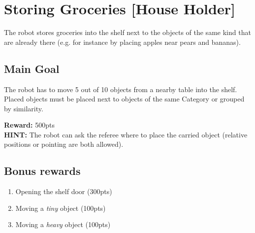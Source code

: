 \section{Storing Groceries [House Holder]}
The robot stores groceries into the shelf next to the objects of the same kind that are already there (e.g. for instance by placing apples near pears and bananas).


\subsection{Main Goal}
The robot has to move 5 out of 10 objects from a nearby table into the shelf. Placed objects must be placed next to objects of the same Category or grouped by similarity.

\noindent\textbf{Reward:} 500pts\\

\noindent\textbf{HINT:} The robot can ask the referee where to place the carried object (relative positions or pointing are both allowed).

\subsection{Bonus rewards}
\begin{enumerate}[nosep]
	\item Opening the shelf door (300pts)
	\item Moving a \emph{tiny} object (100pts)
	\item Moving a \emph{heavy} object (100pts)
\end{enumerate}

%
%

